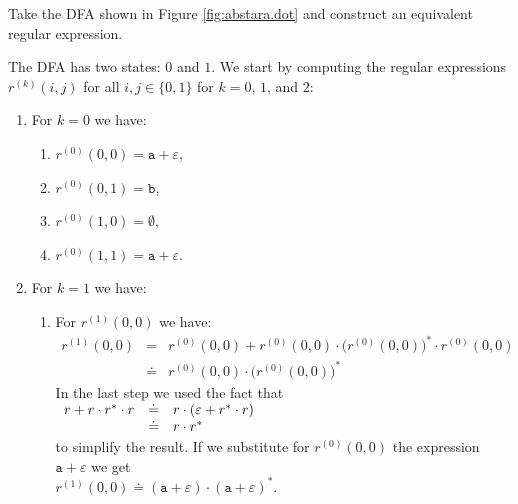 \exerciseEng
Take the \textsc{DFA} shown in Figure \ref{fig:abstara.dot} and construct an equivalent regular expression.


\solutionEng
The \textsc{DFA} has two states: $0$ and $1$.  We start by computing the regular expressions
$r^{(k)}(i,j)$ for all $i,j\in\{0,1\}$ for  $k =0$, $1$, and $2$:
\begin{enumerate}
\item For $k = 0$ we have:
      \begin{enumerate}
      \item $r^{(0)}(0, 0) = \texttt{a} + \varepsilon$,
      \item $r^{(0)}(0, 1) = \texttt{b}$,
      \item $r^{(0)}(1, 0) = \emptyset$,
      \item $r^{(0)}(1, 1) = \texttt{a} + \varepsilon$.
      \end{enumerate}
\item For $k=1$ we have:
      \begin{enumerate}
      \item For $r^{(1)}(0, 0)$ we have:
            \begin{eqnarray*}
                  r^{(1)}(0, 0) 
            & = & r^{(0)}(0, 0) + 
                  r^{(0)}(0, 0) \cdot \bigl(r^{(0)}(0, 0)\bigr)^* \cdot r^{(0)}(0, 0) \\
            & \doteq & r^{(0)}(0, 0) \cdot \bigl(r^{(0)}(0, 0)\bigr)^*
            \end{eqnarray*}
             In the last step we used the fact that 
             \\[0.2cm]
             \hspace*{1.3cm}
             $
             \begin{array}[t]{lcl}
               r + r \cdot r^* \cdot r & \doteq & r \cdot (\varepsilon + r^* \cdot r) \\
                                       & \doteq & r \cdot r^*
             \end{array}
             $
             \\[0.2cm]
             to simplify the result.
             If we substitute for $r^{(0)}(0, 0)$ the expression $\texttt{a} + \varepsilon$  
             we get 
             \\[0.2cm]
             \hspace*{1.3cm}
             $r^{(1)}(0, 0) \doteq (\texttt{a} + \varepsilon)\cdot (\texttt{a} + \varepsilon)^*$.
             \\[0.2cm]

\end{enumerate}
\end{enumerate}
